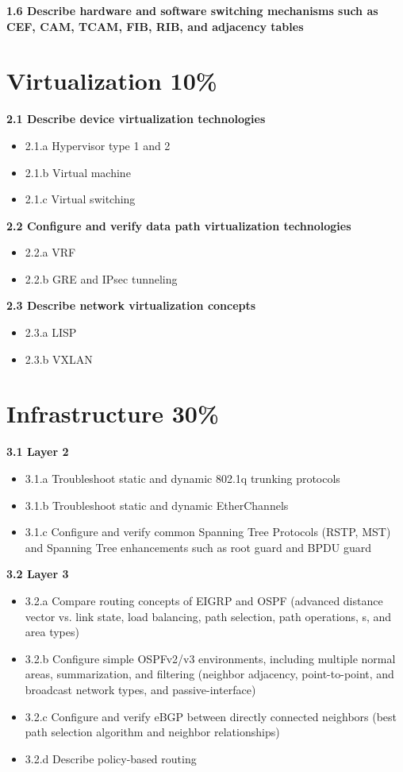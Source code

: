 \documentclass{article}
\begin{document}
\noindent\textbf{1.6 Describe hardware and software switching mechanisms such as CEF, CAM, TCAM, FIB, RIB, and adjacency tables}\\

\newpage
\section{Virtualization 10\%}
\textbf{2.1 Describe device virtualization technologies}
\begin{itemize}
\item 2.1.a Hypervisor type 1 and 2
\item 2.1.b Virtual machine
\item 2.1.c Virtual switching
\end{itemize}

\noindent\textbf{2.2 Configure and verify data path virtualization technologies}
\begin{itemize}
\item 2.2.a VRF
\item 2.2.b GRE and IPsec tunneling
\end{itemize}

\noindent\textbf{2.3 Describe network virtualization concepts}
\begin{itemize}
\item 2.3.a LISP
\item 2.3.b VXLAN
\end{itemize}

\newpage
\section{Infrastructure 30\%}
\textbf{3.1 Layer 2}
\begin{itemize}
\item 3.1.a Troubleshoot static and dynamic 802.1q trunking protocols
\item 3.1.b Troubleshoot static and dynamic EtherChannels
\item 3.1.c Configure and verify common Spanning Tree Protocols (RSTP, MST) and Spanning Tree enhancements such as root guard and BPDU guard
\end{itemize}

\noindent\textbf{3.2 Layer 3}
\begin{itemize}
\item 3.2.a Compare routing concepts of EIGRP and OSPF (advanced distance vector vs. link state, load balancing, path selection, path operations, s, and area types)
\item 3.2.b Configure simple OSPFv2/v3 environments, including multiple normal areas, summarization, and filtering (neighbor adjacency, point-to-point, and broadcast network types, and passive-interface)
\item 3.2.c Configure and verify eBGP between directly connected neighbors (best path selection algorithm and neighbor relationships)
\item 3.2.d Describe policy-based routing
\end{itemize}
\end{document}
